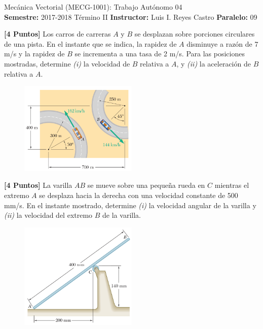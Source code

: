 \documentclass[ a4paper, twoside, 11pt]{article}
\newcommand{\numero}{04}
\begin{document}
\allowdisplaybreaks

\begin{center}
\Large Mec\'anica Vectorial (MECG-1001): Trabajo Aut\'onomo \numero \\[2ex]
\small \textbf{Semestre:} 2017-2018 T\'ermino II \qquad
\textbf{Instructor:} Luis I. Reyes Castro \qquad
\textbf{Paralelo:} 09
\end{center}
\fullskip

\begin{problem}
\textbf{[4 Puntos]} Los carros de carreras $A$ y $B$ se desplazan sobre porciones circulares de una pista. En el instante que se indica, la rapidez de $A$ disminuye a raz\'on de 7 m/s y la rapidez de $B$ se incrementa a una tasa de 2 m/s. Para las posiciones mostradas, determine \textit{(i)} la velocidad de
$B$ relativa a $A$, y \textit{(ii)} la aceleraci\'on de $B$ relativa a $A$.

\begin{figure}[htb]
\centering
\includegraphics[width=0.5\textwidth]{problema-1.jpg}
\end{figure}

\end{problem}
\fullskip
\fullskip

\begin{problem}
\textbf{[4 Puntos]} La varilla $AB$ se mueve sobre una peque\~na rueda en $C$ mientras el extremo $A$ se desplaza hacia la derecha con una velocidad constante de 500 mm/s. En el instante mostrado, determine \textit{(i)} la velocidad angular de la varilla y \textit{(ii)} la velocidad del extremo $B$ de la varilla.

\begin{figure}[htb]
\centering
\includegraphics[width=0.5\textwidth]{problema-2.jpg}
\end{figure}

\end{problem}
\fullskip
\end{document}

